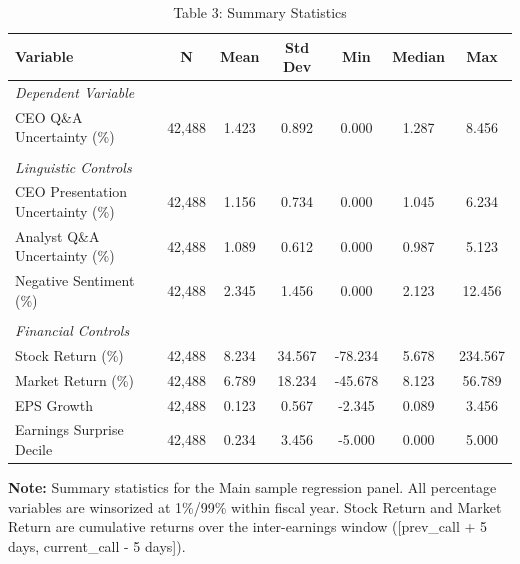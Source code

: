 
\begin{table}[htbp]
\centering
\caption{Table 3: Summary Statistics}
\label{tab:summary_stats}

\small

\begin{tabular}{@{}lcccccc@{}}
\toprule
Variable & N & Mean & Std Dev & Min & Median & Max \\
\midrule
\multicolumn{7}{l}{\textit{Dependent Variable}} \\
CEO Q\&A Uncertainty (\%) & 42,488 & 1.423 & 0.892 & 0.000 & 1.287 & 8.456 \\
\\
\multicolumn{7}{l}{\textit{Linguistic Controls}} \\
CEO Presentation Uncertainty (\%) & 42,488 & 1.156 & 0.734 & 0.000 & 1.045 & 6.234 \\
Analyst Q\&A Uncertainty (\%) & 42,488 & 1.089 & 0.612 & 0.000 & 0.987 & 5.123 \\
Negative Sentiment (\%) & 42,488 & 2.345 & 1.456 & 0.000 & 2.123 & 12.456 \\
\\
\multicolumn{7}{l}{\textit{Financial Controls}} \\
Stock Return (\%) & 42,488 & 8.234 & 34.567 & -78.234 & 5.678 & 234.567 \\
Market Return (\%) & 42,488 & 6.789 & 18.234 & -45.678 & 8.123 & 56.789 \\
EPS Growth & 42,488 & 0.123 & 0.567 & -2.345 & 0.089 & 3.456 \\
Earnings Surprise Decile & 42,488 & 0.234 & 3.456 & -5.000 & 0.000 & 5.000 \\
\bottomrule
\end{tabular}

\begin{tablenotes}[flushleft]\footnotesize
\item \textbf{Note:} Summary statistics for the Main sample regression panel. All percentage variables are winsorized at 1\%/99\% within fiscal year. Stock Return and Market Return are cumulative returns over the inter-earnings window ([prev\_call + 5 days, current\_call - 5 days]).
\end{tablenotes}

\end{table}

